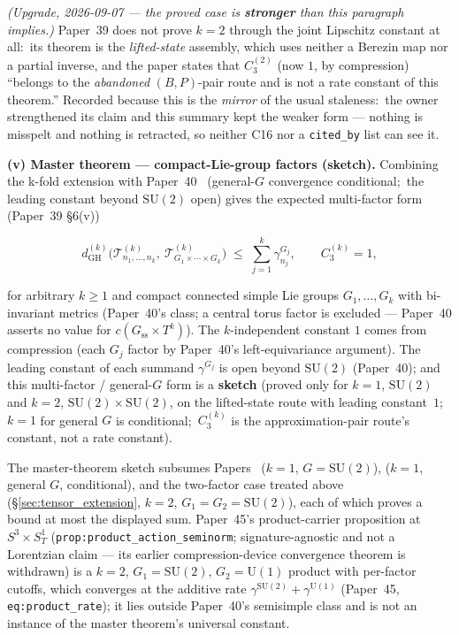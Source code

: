 \documentclass[11pt,a4paper]{article}
\theoremstyle{plain}
\theoremstyle{definition}
\newcommand{\sthree}{S^{3}}
\newcommand{\Tcal}{\mathcal{T}}
\newcommand{\SU}{\mathrm{SU}}
\newcommand{\Uone}{\mathrm{U}(1)}
\newcommand{\Sone}{S^{1}}
\newcommand{\gvc}[2]{#2}
\begin{document}
\emph{(Upgrade, 2026-09-07 --- the proved case is \textbf{stronger} than this
paragraph implies.)} Paper~39 does not prove $k=2$ through the joint
Lipschitz constant at all:\ its theorem is the \emph{lifted-state}
assembly, which uses neither a Berezin map nor a partial inverse, and the
paper states that $C_3^{(2)}$ (now $1$, by compression) ``belongs to the
\emph{abandoned} $(B,P)$-pair route and is not a rate constant of this
theorem.'' Recorded because this is
the \emph{mirror} of the usual staleness:\ the owner strengthened its claim
and this summary kept the weaker form --- nothing is misspelt and nothing is
retracted, so neither C16 nor a \texttt{cited\_by} list can see it.

\textbf{(v) Master theorem --- compact-Lie-group factors
(sketch).}
Combining the k-fold extension with Paper~40~\cite{paper40_unified}
(general-$G$ convergence conditional;\ the leading constant beyond
$\SU(2)$ open) gives the expected multi-factor form (Paper~39 \S6(v))

\begin{equation}\label{eq:master_theorem}
d_{\mathrm{GH}}^{(k)}\bigl(\Tcal^{(k)}_{n_{1}, \ldots, n_{k}},\
\Tcal^{(k)}_{G_{1} \times \cdots \times G_{k}}\bigr)
\;\le\; \sum_{j=1}^{k} \gamma^{G_{j}}_{n_{j}},
\qquad
C_{3}^{(k)} = 1,
\end{equation}

for arbitrary $k \ge 1$ and compact connected simple Lie groups
$G_{1}, \ldots, G_{k}$ with bi-invariant metrics (Paper~40's class; a
central torus factor is excluded --- Paper~40 asserts no value for
$c(G_{\mathrm{ss}} \times T^{k})$). The $k$-independent constant $1$ comes
from compression (each $G_j$ factor by Paper~40's left-equivariance
argument). The leading constant of each summand $\gamma^{G_j}$ is open
beyond $\SU(2)$ (Paper~40); \gvc{p40-general-g-conditional}{and this multi-factor / general-$G$ form is a
\textbf{sketch} (proved only for $k=1$, $\SU(2)$ and $k=2$,
$\SU(2)\times\SU(2)$, on the lifted-state route with leading
constant~$1$;\ $k=1$ for general $G$ is conditional;\ $C_3^{(k)}$ is the
approximation-pair route's constant, not a rate constant)}.

The master-theorem sketch subsumes Papers~\cite{paper38}
($k = 1$, $G = \SU(2)$), \cite{paper40_unified}
($k = 1$, general $G$, conditional), and the two-factor case
treated above (\S\ref{sec:tensor_extension}, $k = 2$,
$G_{1} = G_{2} = \SU(2)$), each of which proves a bound at most the
displayed sum.  \gvc{p45-rates-spatial}{Paper~45's product-carrier
proposition at $\sthree \times \Sone_{T}$ (\texttt{prop:product\_action\_seminorm};
signature-agnostic and not a Lorentzian claim} --- its earlier
compression-device convergence theorem is withdrawn) is a $k = 2$,
$G_{1} = \SU(2)$, $G_{2} = \Uone$ product with per-factor cutoffs, which
converges at the additive rate $\gamma^{\SU(2)} + \gamma^{\Uone}$
(Paper~45, \texttt{eq:product\_rate}); it lies outside Paper~40's semisimple
class and is not an instance of the master theorem's universal
constant.
\end{document}
